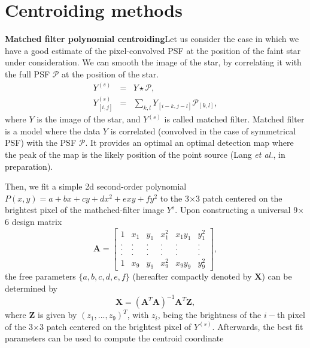 \documentclass[12pt, preprint]{aastex}
\newcommand{\beq}{\begin{equation}}
\newcommand{\eeq}{\end{equation}}
\begin{document}
\section{Centroiding methods}\label{sec:method}

\item{\bf  Matched filter polynomial centroiding}\quad Let us consider the case 
in which we have a good estimate of the pixel-convolved PSF at
the position of the faint star under consideration. 
We can smooth the image of the star, by correlating it with the 
full PSF $\mathcal{P}$ at the position of the star.
\begin{eqnarray}
Y^{(s)} &=& Y \star \mathcal{P}, \\
Y^{(s)}_{[i,j]} &=& \sum_{k,l}Y_{[i-k,j-l]}\mathcal{P}_{[k,l]},
\end{eqnarray}
where $Y$ is the image of the star, and $Y^{(s)}$ is called matched filter. 
Matched filter is a model where the data $Y$ is correlated (convolved in the 
case of symmetrical PSF) with the PSF $\mathcal{P}$. It provides an optimal an 
optimal detection map where the peak of the map is the likely position of the 
point source (Lang \emph{et al.}, in preparation).

Then, we fit a simple 2d second-order polynomial 
$P(x,y)=a+bx+cy+dx^2+exy+fy^2$ 
to the 3$\times$3 patch centered on the brightest pixel of the
mathched-filter image $Y^{s}$.
Upon constructing a universal 9$\times$6 design matrix
\begin{equation}
    \mathbf{A} = 
    \begin{bmatrix}
        1 & x_{1} & y_{1} & x_{1}^{2} & x_{1}y_{1} & y_{1}^{2} \\
        . & . & . & . & . & .  \\
        . & . & . & . & . & .  \\
        . & . & . & . & . & .  \\
        1 & x_{9} & y_{9} & x_{9}^{2} & x_{9}y_{9} & y_{9}^{2}
    \end{bmatrix},
\end{equation}
the free parameters $\{a,b,c,d,e,f\}$
(hereafter compactly denoted by $\mathbf{X}$) can be determined by 
\beq
\mathbf{X} = (\mathbf{A}^{T}\mathbf{A})^{-1}\mathbf{A}^{T}\mathbf{Z},
\label{linearfit}
\eeq
where $\mathbf{Z}$ is given by $(z_{1},...,z_{9})^{T}$,
with $z_{i}$, being the brightness of the $i-$th pixel of the 3$\times$3 patch centered on the brightest pixel of $Y^{(s)}$.
Afterwards, the best fit parameters can be used to compute the centroid coordinate
\end{document}

